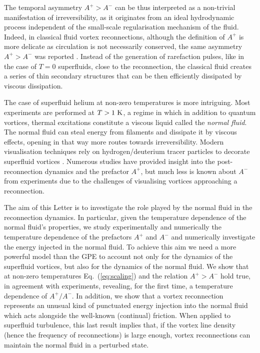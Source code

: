 \documentclass[%
superscriptaddress,
 amsmath,amssymb,
 aps,
]{revtex4-2}
\begin{document}
The temporal asymmetry $A^+>A^-$ can be thus interpreted as a non-trivial manifestation of irreversibility, as it originates from an ideal hydrodynamic process independent of the small-scale regularisation mechanism of the fluid.
%
Indeed, in classical fluid vortex reconnections, although the definition of $A^+$ is more delicate as circulation is not necessarily conserved, the same asymmetry $A^+>A^-$ was reported \cite{yaoSeparationScalingViscous2020}. Instead of the generation of rarefaction pulses, like in the case of $T=0$ superfluids, close to the reconnection, the classical fluid creates a series of thin secondary structures that can be then efficiently dissipated by viscous dissipation.

The case of superfluid helium at non-zero temperatures
is more intriguing. Most experiments are performed at $T>1~\rm K$, a regime in which in addition to quantum vortices, thermal excitations constitute a viscous liquid called the {\it normal fluid}. The normal fluid can steal energy from filaments and dissipate it by viscous effects, opening in that way more routes towards irreversibility. Modern visualisation techniques rely on hydrogen/deuterium tracer particles to decorate superfluid vortices \cite{paoletti2008velocity,bewley2008,guo2014visualization,perettiDirectVisualizationQuantum2023}. Numerous studies have provided insight into the post-reconnection dynamics and the prefactor $A^{+}$, but much less is known about $A^-$ from experiments due to the challenges of visualising vortices approaching a reconnection.

The aim of this Letter is to investigate the role played by the normal fluid in the reconnection dynamics. In particular, given the temperature dependence of the normal fluid's properties, we study experimentally and numerically the temperature dependence of the prefactors $A^+$ and $A^-$ and numerically investigate the energy injected in the normal fluid. 
%
To achieve this aim we need a more powerful model than the GPE to account not only for the dynamics of the
superfluid vortices, but also for the dynamics of the normal fluid. 
We show that at non-zero temperatures Eq.~(\ref{eq:scaling}) and the
relation $A^+>A^-$ hold true, in agreement with experiments, revealing, for the 
first time, a temperature dependence of $A^+/A^-$. In addition, we
show that a vortex
reconnection represents an unusual kind of
punctuated energy injection into the normal fluid which acts alongside
the well-known (continual) friction.
When applied to superfluid turbulence, this last result implies that,
if the vortex line density (hence the frequency of reconnections) 
is large enough, vortex
reconnections can maintain the normal fluid in a perturbed state.
\end{document}
